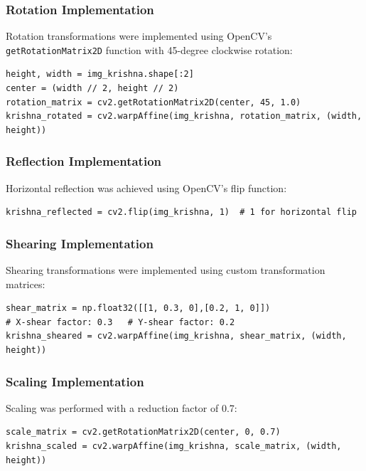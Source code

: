 \documentclass[a4paper, journal]{IEEEtran}
\begin{document}
\subsubsection{Rotation Implementation}
Rotation transformations were implemented using OpenCV's \texttt{getRotationMatrix2D} function with 45-degree clockwise rotation:

\begin{lstlisting}[caption=Rotation Transformation]
height, width = img_krishna.shape[:2]
center = (width // 2, height // 2)
rotation_matrix = cv2.getRotationMatrix2D(center, 45, 1.0)
krishna_rotated = cv2.warpAffine(img_krishna, rotation_matrix, (width, height))
\end{lstlisting}

\subsubsection{Reflection Implementation}
Horizontal reflection was achieved using OpenCV's flip function:

\begin{lstlisting}[caption=Reflection Transformation]
krishna_reflected = cv2.flip(img_krishna, 1)  # 1 for horizontal flip
\end{lstlisting}

\subsubsection{Shearing Implementation}
Shearing transformations were implemented using custom transformation matrices:

\begin{lstlisting}[caption=Shearing Transformation]
shear_matrix = np.float32([[1, 0.3, 0],[0.2, 1, 0]]) 
# X-shear factor: 0.3   # Y-shear factor: 0.2
krishna_sheared = cv2.warpAffine(img_krishna, shear_matrix, (width, height))
\end{lstlisting}

\subsubsection{Scaling Implementation}
Scaling was performed with a reduction factor of 0.7:

\begin{lstlisting}[caption=Scaling Transformation]
scale_matrix = cv2.getRotationMatrix2D(center, 0, 0.7)
krishna_scaled = cv2.warpAffine(img_krishna, scale_matrix, (width, height))
\end{lstlisting}
\end{document}
